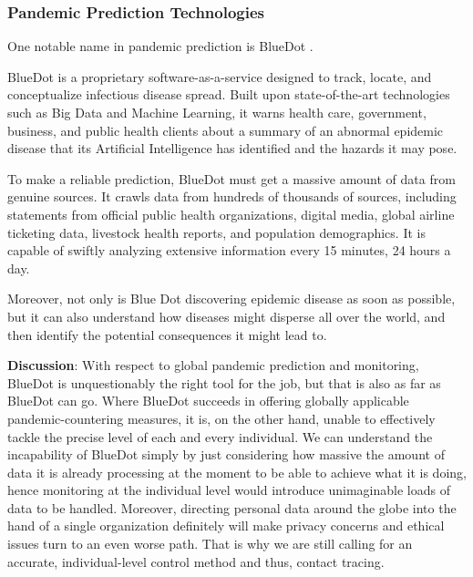       \subsubsection{Pandemic Prediction Technologies}
        \par One notable name in pandemic prediction is BlueDot \parencite{BlueDotHome} \parencite{BlueDotCNBC}.
        \par BlueDot is a proprietary software-as-a-service designed to track, locate, and conceptualize infectious disease spread. Built upon state-of-the-art technologies such as Big Data and Machine Learning, it warns health care, government, business, and public health clients about a summary of an abnormal epidemic disease that its Artificial Intelligence has identified and the hazards it may pose.
        \par To make a reliable prediction, BlueDot must get a massive amount of data from genuine sources. It crawls data from hundreds of thousands of sources, including statements from official public health organizations, digital media, global airline ticketing data, livestock health reports, and population demographics. It is capable of swiftly analyzing extensive information every 15 minutes, 24 hours a day.
        \par Moreover, not only is Blue Dot discovering epidemic disease as soon as possible, but it can also understand how diseases might disperse all over the world, and then identify the potential consequences it might lead to.
        \par \textbf{Discussion}: With respect to global pandemic prediction and monitoring, BlueDot is unquestionably the right tool for the job, but that is also as far as BlueDot can go. Where BlueDot succeeds in offering globally applicable pandemic-countering measures, it is, on the other hand, unable to effectively tackle the precise level of each and every individual. We can understand the incapability of BlueDot simply by just considering how massive the amount of data it is already processing at the moment to be able to achieve what it is doing, hence monitoring at the individual level would introduce unimaginable loads of data to be handled. Moreover, directing personal data around the globe into the hand of a single organization definitely will make privacy concerns and ethical issues turn to an even worse path. That is why we are still calling for an accurate, individual-level control method and thus, contact tracing.

